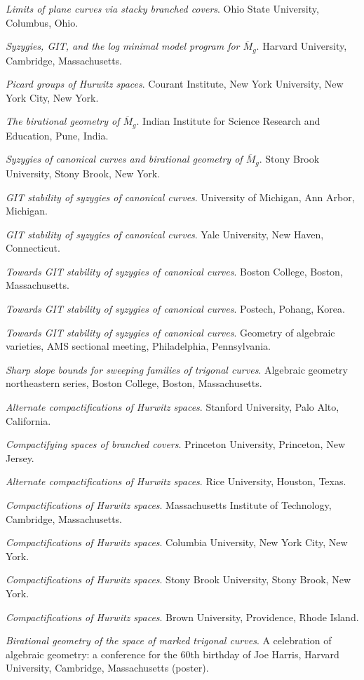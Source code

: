 \documentclass[11pt]{article}
\begin{document}
\begin{description}
\emph{Limits of plane curves via stacky branched covers}.
Ohio State University, Columbus, Ohio.

\emph{Syzygies, GIT, and the log minimal model program for \(\overline{M}_g\)}.
Harvard University, Cambridge, Massachusetts.

\emph{Picard groups of Hurwitz spaces}.
Courant Institute, New York University, New York City, New York.

\emph{The birational geometry of \(\overline M_g\)}.
Indian Institute for Science Research and Education, Pune, India.

\emph{Syzygies of canonical curves and birational geometry of \(\overline M_g\)}.
Stony Brook University, Stony Brook, New York.
\item[{2014}] \emph{GIT stability of syzygies of canonical curves}.
University of Michigan, Ann Arbor, Michigan.

\emph{GIT stability of syzygies of canonical curves}.
Yale University, New Haven, Connecticut.

\emph{Towards GIT stability of syzygies of canonical curves}.
Boston College, Boston, Massachusetts.
\item[{2013}] \emph{Towards GIT stability of syzygies of canonical curves}.
Postech, Pohang, Korea.

\emph{Towards GIT stability of syzygies of canonical curves}.
Geometry of algebraic varieties, AMS sectional meeting, Philadelphia, Pennsylvania.

\emph{Sharp slope bounds for sweeping families of trigonal curves}.
Algebraic geometry northeastern series, Boston College, Boston, Massachusetts.

\emph{Alternate compactifications of Hurwitz spaces}.
Stanford University, Palo Alto, California.

\emph{Compactifying spaces of branched covers}.
Princeton University, Princeton, New Jersey.
\item[{2012}] \emph{Alternate compactifications of Hurwitz spaces}.
Rice University, Houston, Texas.
\item[{2011}] \emph{Compactifications of Hurwitz spaces}.
Massachusetts Institute of Technology, Cambridge, Massachusetts.

\emph{Compactifications of Hurwitz spaces}.
Columbia University, New York City, New York.

\emph{Compactifications of Hurwitz spaces}.
Stony Brook University, Stony Brook, New York.

\emph{Compactifications of Hurwitz spaces}.
Brown University, Providence, Rhode Island.

\emph{Birational geometry of the space of marked trigonal curves}.
A celebration of algebraic geometry: a conference for the 60th birthday of Joe Harris, Harvard University, Cambridge, Massachusetts (poster).
\end{description}
\end{document}
